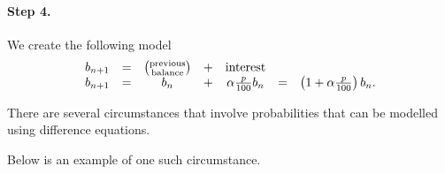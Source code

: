 \begin{example}
\paragraph{Step 4.} We create the following model
$$ 
\begin{array}{ccccccl}
b_{n+1} & = & \big(\substack{\rm previous\\ \rm balance}\big) & + & {\rm interest} \\
b_{n+1}& =& b_n & + & \alpha \frac{p}{100} b_n & = & \left( 1 + \alpha \frac{p}{100}\right) b_n.
\end{array}
$$
	
\end{example}


\hfill

\newpage 
{}

There are several circumstances that involve probabilities that can be modelled using difference equations.

Below is an example of one such circumstance.


